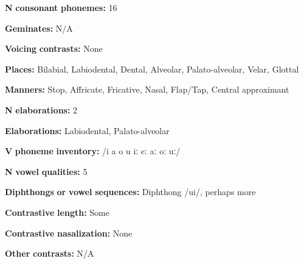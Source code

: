 \documentclass[output=paper]{langsci/langscibook}
\begin{document}
\begin{styleBody}
\textbf{N} \textbf{consonant} \textbf{phonemes:} 16
\end{styleBody}

\begin{styleBody}
\textbf{Geminates:} N/A
\end{styleBody}

\begin{styleBody}
\textbf{Voicing} \textbf{contrasts:} None
\end{styleBody}

\begin{styleBody}
\textbf{Places:} Bilabial, Labiodental, Dental, Alveolar, Palato-alveolar, Velar, Glottal
\end{styleBody}

\begin{styleBody}
\textbf{Manners:} Stop, Affricate, Fricative, Nasal, Flap/Tap, Central approximant
\end{styleBody}

\begin{styleBody}
\textbf{N} \textbf{elaborations:} 2
\end{styleBody}

\begin{styleBody}
\textbf{Elaborations:} Labiodental, Palato-alveolar
\end{styleBody}

\begin{styleBody}
\textbf{V} \textbf{phoneme} \textbf{inventory:} /i a o u iː eː aː oː uː/
\end{styleBody}

\begin{styleBody}
\textbf{N} \textbf{vowel} \textbf{qualities:} 5
\end{styleBody}

\begin{styleBody}
\textbf{Diphthongs} \textbf{or} \textbf{vowel} \textbf{sequences:} Diphthong /ui/, perhaps more
\end{styleBody}

\begin{styleBody}
\textbf{Contrastive} \textbf{length:} Some
\end{styleBody}

\begin{styleBody}
\textbf{Contrastive} \textbf{nasalization:} None
\end{styleBody}

\begin{styleBody}
\textbf{Other} \textbf{contrasts:} N/A
\end{styleBody}
\end{document}
